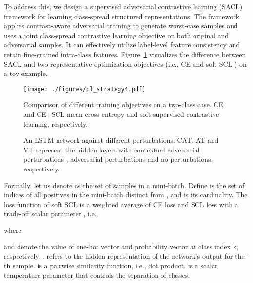 \documentclass[11pt]{article}
\begin{document}
To address this, we design a supervised adversarial contrastive learning (SACL) framework for learning class-spread structured representations. 
The framework applies contrast-aware adversarial training to generate worst-case samples and uses a joint class-spread contrastive learning objective on both original and adversarial samples. It can effectively utilize label-level feature consistency and retain fine-grained intra-class features. 
Figure~\ref{fig:sacl_difference} visualizes the difference between SACL and two representative optimization objectives (i.e., CE and soft SCL \citep{gunel2020supervised}) on a toy example.

\begin{figure}[t]
  \centering
    \texttt{[image: ./figures/cl\_strategy4.pdf]}
    \caption{Comparison of different training objectives on a two-class case.
    CE and CE+SCL mean cross-entropy and soft supervised contrastive learning, respectively.
    }
  \label{fig:sacl_difference}
\end{figure}

\begin{figure*}[t]
  \centering
       \caption{
    An LSTM network against different perturbations.
    CAT, AT and VT represent the hidden layers with contextual adversarial perturbations , adversarial perturbations  and no perturbations, respectively.
    }
  \label{fig:perturb}
\end{figure*}


Formally, let us denote  as the set of samples in a mini-batch.
Define  is the set of indices of all positives in the mini-batch distinct from , and  is its cardinality.
The loss function of soft SCL is a weighted average of CE loss and SCL loss with a trade-off scalar parameter , i.e., 

where 
   

 and  denote the value of one-hot vector  and probability vector  at class index k, respectively.
. 
 refers to the hidden representation of the network's output for the -th sample.
 is a pairwise similarity function, 
i.e., dot product.
 is a scalar temperature parameter that controls the separation of classes. 
\end{document}
